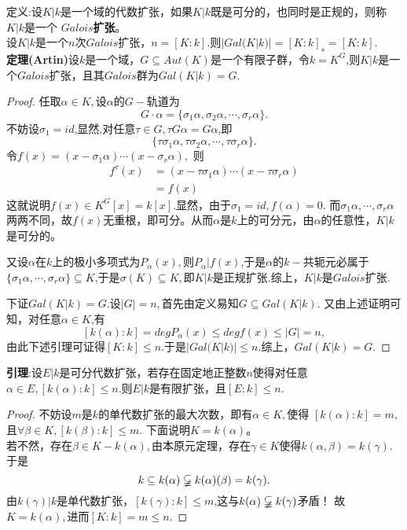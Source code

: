 \documentclass[UTF8]{article}
\begin{document}
定义:设$K|k$是一个域的代数扩张，如果$K|k$既是可分的，也同时是正规的，则称$K|k$是一个
\textbf{$Galois$扩张}。\\
设$K|k$是一个$n$次$Galois$扩张，$n=[K:k]$.则$|Gal(K|k)|=[K:k]_{s}=[K:k]$.\\
\textbf{定理(Artin)}设$k$是一个域，$G\subseteq Aut(K)$是一个有限子群，令$k=K^{G}$,则$K|k$是一个$Galois$扩张，且其$Galois$群为$Gal(K|k)=G$.\\
\begin{proof}
	任取$\alpha\in K,$设$\alpha$的$G-$轨道为
	$$
	G\cdot\alpha=\{\sigma_{1}\alpha,\sigma_{2}\alpha,\cdots,\sigma_{r}\alpha\}.
	$$
	不妨设$\sigma_{1}=id$,显然,对任意$\tau\in G,\tau G\alpha=G\alpha$,即
	$$
	\{\tau\sigma_{1}\alpha,\tau\sigma_{2}\alpha,\cdots,\tau\sigma_{r}\alpha\}.
	$$
	令$f(x)=(x-\sigma_{1}\alpha)\cdots(x-\sigma_{r}\alpha),$
	则
	\[\begin{split}
	f^{\tau}(x)&=(x-\tau\sigma_{1}\alpha)\cdots(x-\tau\sigma_{r}\alpha)\\
	&=f(x)
	\end{split}
	\]
	这就说明$f(x)\in K^{G}[x]=k[x].$显然，由于$\sigma_{1}=id,f(\alpha)=0.$
	而$\sigma_{1}\alpha,\cdots,\sigma_{r}\alpha$两两不同，故$f(x)$无重根，即可分。从而$\alpha$是$k$上的可分元，由$\alpha$的任意性，$K|k$是可分的。
	
	又设$\alpha$在$k$上的极小多项式为$P_{\alpha}(x),$则$P_{\alpha}|f(x)$,于是$\alpha$的$k-$共轭元必属于$\{\sigma_{1}\alpha,\cdots,\sigma_{r}\alpha\}\subseteq K$,于是$\sigma(K)\subseteq K,$即$K|k$是正规扩张.综上，$K|k$是$Galois$扩张.
	
	
	下证$Gal(K|k)=G$.设$|G|=n,$首先由定义易知$G\subseteq Gal(K|k).$
	又由上述证明可知，对任意$\alpha\in K$,有
	$$
	[k(\alpha):k]=degP_{\alpha}(x)\leq degf(x)\leq |G|=n,
	$$
	由此下述引理可证得$[K:k]\leq n$.于是$|Gal(K|k)|\leq n.$综上，$Gal(K|k)=G.$
\end{proof}
\textbf{引理}:设$E|k$是可分代数扩张，若存在固定地正整数$n$使得对任意
$\alpha\in E,[k(\alpha):k]\leq n.$则$E|k$是有限扩张，且$[E:k]\leq n$.\\
\begin{proof}
	不妨设$m$是$k$的单代数扩张的最大次数，即有$\alpha\in K,$使得
	$[k(\alpha):k]=m,$且$\forall \beta \in K,[k(\beta):k]\leq m.$
	下面说明$K=k(\alpha)$。\\
	若不然，存在$\beta\in K-k(\alpha),$由本原元定理，存在$\gamma\in K$使得$k(\alpha,\beta)=k(\gamma).$于是
	$$
	k\subseteq k(\alpha)\varsubsetneqq k(\alpha)(\beta)=k(\gamma).
	$$
	由$k(\gamma)|k$是单代数扩张，$[k(\gamma):k]\leq m$,这与$k(\alpha)\varsubsetneqq k(\gamma)$矛盾！
	故$K=k(\alpha),$进而$[K:k]=m \leq n$.
\end{proof}
\end{document}
